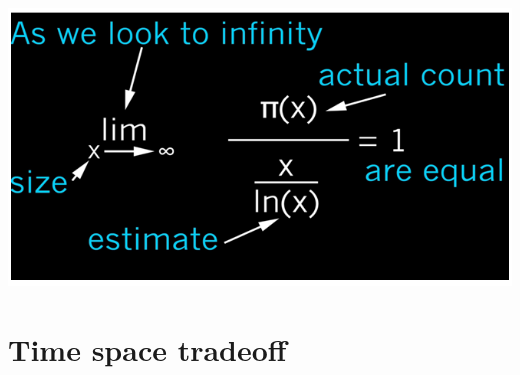 \documentclass{report}
\begin{document}
\begin{center}
	\includegraphics[scale=1]{66.png}
\end{center}

\section{Time space tradeoff}
\end{document}
